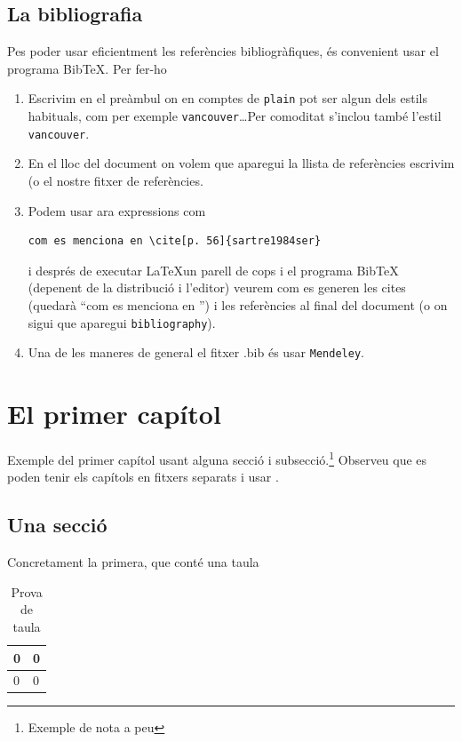 \documentclass[11pt, a4paper,twoside]{tfg_dtic_upf}
\numberwithin{equation}{section}
\begin{document}
\section*{La bibliografia}
Pes poder usar eficientment les referències bibliogràfiques, és convenient usar el programa BibTeX. Per fer-ho 
\begin{enumerate}
\item Escrivim en el preàmbul \verb++ on en comptes de \verb+plain+ pot ser algun dels estils habituals, com per exemple \verb+vancouver+\ldots Per comoditat s'inclou també l'estil \verb+vancouver+.

\item En el lloc del document on volem que aparegui la llista de referències escrivim \verb+ + (o el nostre fitxer de referències.

\item Podem usar ara expressions com 
\begin{verbatim} 
com es menciona en \cite[p. 56]{sartre1984ser}
\end{verbatim}
 i després de executar \LaTeX un parell de cops i el programa BibTeX (depenent de la distribució i l'editor) veurem com es generen les cites (quedarà ``com es menciona en \cite[p. 56]{sartre1984ser}'') i les referències al final del document (o on sigui que aparegui \verb+bibliography+).


\item Una de les maneres de general el fitxer .bib és usar \verb+Mendeley+.

\end{enumerate}




\chapter{El primer capítol}
Exemple del primer capítol usant alguna secció i subsecció.\footnote{Exemple de nota a peu} Observeu que es poden tenir els capítols en fitxers separats i usar \verb++.


\section{Una secció}
Concretament la primera, que conté una taula

\begin{table}[h]
  \centering
  \begin{tabular}{|l|l|}
   \hline
    0 & 0 \\ \hline
    0 & 0 \\ \hline    
  \end{tabular}
  \caption{Prova de taula}

\end{table}
\end{document}

